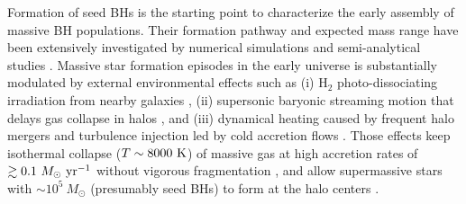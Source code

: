 \documentclass[twocolumn, twocolappendix]{aastex63}
\newcommand{\Msun}{M_\odot}
\newcommand{\Msunyr}{M_\odot~{\rm yr}^{-1}}
\newcommand{\hh}{\mathrm{H_2}}
\newcommand{\red}[1]{\textcolor{red}{ #1}}
\begin{document}
\begin{CJK*}{UTF8}{gbsn}
Formation of seed BHs is the starting point to characterize the early assembly of massive BH populations.
Their formation pathway and expected mass range have been extensively investigated by numerical simulations and
semi-analytical studies
\citep{2006MNRAS.370..289B,2009ApJ...696.1798T,2012MNRAS.422.2051N,2014ApJ...781...60H,
2015MNRAS.448..568H,2018MNRAS.474.3825V,2021MNRAS.506..613S,2022arXiv220614459T}.
Massive star formation episodes in the early universe is substantially modulated by external environmental effects such as
(i) H$_2$ photo-dissociating irradiation from nearby galaxies
\citep{2001ApJ...546..635O,2002ApJ...569..558O,2003Natur.425..812B,2010MNRAS.402.1249S,2014MNRAS.445..544S,2014MNRAS.445..107V,2016ApJ...832..134C},
(ii) supersonic baryonic streaming motion that delays gas collapse in halos
\citep{2012MNRAS.424.1335F, 2014MNRAS.439.1092T, 2018ApJ...855...17H,2017MNRAS.471.4878S,2018MNRAS.479.4017I},
and
(iii) dynamical heating caused by frequent halo mergers and turbulence injection led by cold accretion flows
\citep{2003ApJ...592..645Y,2010Natur.466.1082M,2015ApJ...810...51M,2019Natur.566...85W,2022Natur.607...48L}.
Those effects keep isothermal collapse ($T\sim 8000~{\rm K}$) of massive gas at high accretion rates of $\gtrsim 0.1~\Msunyr$
without vigorous fragmentation \citep{2014MNRAS.445L.109I,2015MNRAS.446.2380B,2016PASA...33...51L},%
and allow supermassive stars with $\sim 10^5~\Msun$ (presumably seed BHs) to form at the halo centers 
\citep{2013ApJ...778..178H,2013A&A...558A..59S,2019PASA...36...27W,2022arXiv220614459T}.

\end{CJK*}
\end{document}
